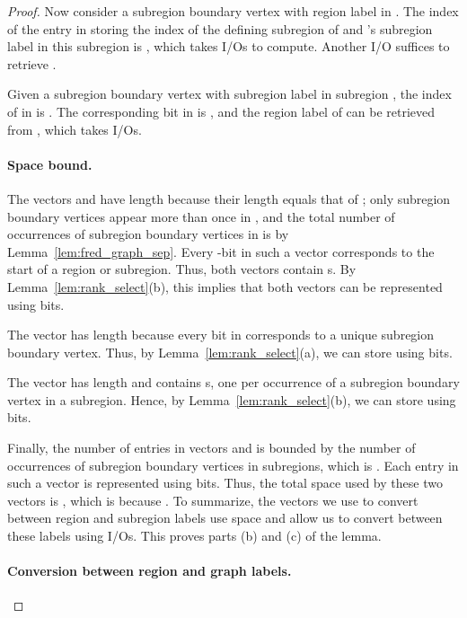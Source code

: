 \begin{proof}
  Now consider a subregion boundary vertex  with region label
   in .
  The index of the entry in  storing the index of the defining
  subregion of  and 's subregion label in this subregion is 
  , which takes
   I/Os to compute.
  Another I/O suffices to retrieve .

  Given a subregion boundary vertex  with subregion label
   in subregion , the index of  in
   is .
  The corresponding bit  in  is , and the
  region label of  can be retrieved from
  , which takes  I/Os.

\paragraph{Space bound.}


  The vectors  and  have length
   because their length
  equals that of ; only subregion boundary vertices appear more
  than once in , and the total number of occurrences of subregion
  boundary vertices in  is  by
  Lemma~\ref{lem:fred_graph_sep}.
  Every -bit in such a vector corresponds to the start of a region
  or subregion.
  Thus, both vectors contain  s.
  By Lemma~\ref{lem:rank_select}(b), this implies that both vectors can
  be represented using  bits.

  The vector  has length 
  because every bit in  corresponds to a unique subregion boundary
  vertex.
  Thus, by Lemma~\ref{lem:rank_select}(a), we can store  using
   bits.

  The vector  has length  and contains
   s, one per occurrence of a subregion boundary
  vertex in a subregion.
  Hence, by Lemma~\ref{lem:rank_select}(b), we can store  using
   bits.

  Finally, the number of entries in vectors  and  is
  bounded by the number of occurrences of subregion boundary vertices in
  subregions, which is .
  Each entry in such a vector is represented using
   bits.
  Thus, the total space used by these two vectors is
  ,
  which is  because .
  To summarize, the vectors we use to convert between region and subregion
  labels use  space and allow us to convert between these labels
  using  I/Os.
  This proves parts (b) and (c) of the lemma.

\paragraph{Conversion between region and graph labels.}



\end{proof}
